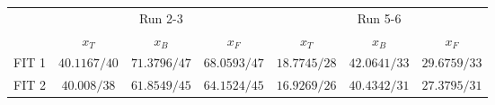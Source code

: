 \begin{tabular}{c|ccc|ccc}
\hline
      & \multicolumn{3}{c|}{Run 2-3}                     & \multicolumn{3}{c}{Run 5-6}                      \\ \cline{2-7} 
      & $x_T$          & $x_B$          & $x_F$          & $x_T$          & $x_B$          & $x_F$          \\ \hline
FIT 1 & $40.1167 / 40$ & $71.3796 / 47$ & $68.0593 / 47$ & $18.7745 / 28$ & $42.0641 / 33$ & $29.6759 / 33$ \\ \hline
FIT 2 & $40.008 / 38$  & $61.8549 / 45$ & $64.1524 / 45$ & $16.9269 / 26$ & $40.4342 / 31$ & $27.3795 / 31$ \\ \hline
\end{tabular}